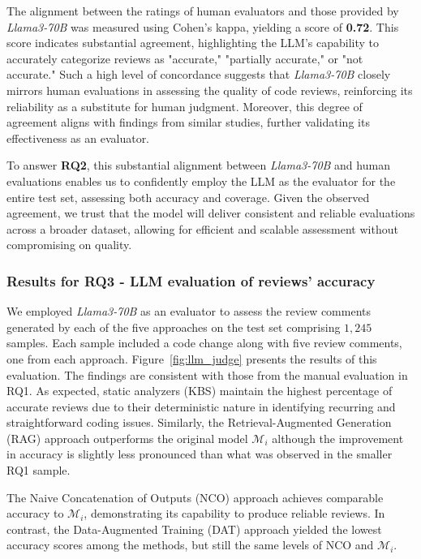 The alignment between the ratings of human evaluators and those provided by \emph{Llama3-70B} was measured using Cohen's kappa, yielding a score of \textbf{0.72}. This score indicates substantial agreement, highlighting the LLM’s capability to accurately categorize reviews as "accurate," "partially accurate," or "not accurate." Such a high level of concordance suggests that \emph{Llama3-70B} closely mirrors human evaluations in assessing the quality of code reviews, reinforcing its reliability as a substitute for human judgment. Moreover, this degree of agreement aligns with findings from similar studies, further validating its effectiveness as an evaluator.

To answer \textbf{RQ2}, this substantial alignment between \emph{Llama3-70B} and human evaluations enables us to confidently employ the LLM as the evaluator for the entire test set, assessing both accuracy and coverage. Given the observed agreement, we trust that the model will deliver consistent and reliable evaluations across a broader dataset, allowing for efficient and scalable assessment without compromising on quality.



\subsubsection{Results for RQ3 -  LLM evaluation of reviews' accuracy}

We employed \emph{Llama3-70B} as an evaluator to assess the review comments generated by each of the five approaches on the test set comprising $1,245$ samples. Each sample included a code change along with five review comments, one from each approach. Figure~\ref{fig:llm_judge} presents the results of this evaluation.
The findings are consistent with those from the manual evaluation in RQ1. As expected, static analyzers (KBS) maintain the highest percentage of accurate reviews due to their deterministic nature in identifying recurring and straightforward coding issues. Similarly, the Retrieval-Augmented Generation (RAG) approach outperforms the original model \(\mathcal{M}_i\) although the improvement in accuracy is slightly less pronounced than what was observed in the smaller RQ1 sample.

The Naive Concatenation of Outputs (NCO) approach achieves comparable accuracy to \(\mathcal{M}_i\), demonstrating its capability to produce reliable reviews. In contrast, the Data-Augmented Training (DAT) approach yielded the lowest accuracy scores among the methods, but still the same levels of NCO and \(\mathcal{M}_i\).

